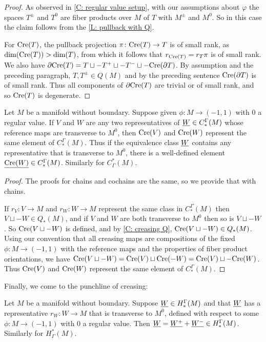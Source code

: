 \begin{proof}
	As observed in \cref{C: regular value setup}, with our assumptions about $\varphi$ the spaces $T^\pm$ and $T^0$ are fiber products over $M$ of $T$ with $M^\pm$ and $M^0$.
	So in this case the claim follows from the \cref{L: pullback with Q}.

	For $\mathrm{Cre}(T)$, the pullback projection $\pi \colon \mathrm{Cre}(T) \to T$ is of small rank, as $\dim(\mathrm{Cre}(T))>\dim(T)$, from which it follows that $r_{\mathrm{Cre}(T)} = r_T\pi$ is of small rank.
	We also have $\partial \mathrm{Cre}(T) = T \sqcup - T^+ \sqcup -T^- \sqcup -\mathrm{Cre}(\partial T)$.
	By assumption and the preceding paragraph, $T, T^\pm \in Q(M)$ and by the preceding sentence $\mathrm{Cre}(\partial T)$ is of small rank.
	Thus all components of $\partial \mathrm{Cre}(T)$ are trivial or of small rank, and so $\mathrm{Cre}(T)$ is degenerate.
\end{proof}

\begin{proposition}
	Let $M$ be a manifold without boundary.
	Suppose given $\phi \colon M \to (-1,1)$ with $0$ a regular value.
	If $V$ and $W$ are any two representatives of $\underline{W} \in C_*^\Gamma(M)$ whose reference maps are transverse to $M^0$, then $\mathrm{Cre}(V)$ and $\mathrm{Cre}(W)$ represent the same element of $C_*^\Gamma(M)$.
	Thus if the equivalence class $\underline{W}$ contains any representative that is transverse to $M^0$, there is a well-defined element $\underline{\mathrm{Cre}(W)} \in C_*^\Gamma(M)$.
	Similarly for $C^*_\Gamma(M)$.
\end{proposition}

\begin{proof}
	The proofs for chains and cochains are the same, so we provide that with chains.

	If $r_V \colon V \to M$ and $r_W \colon W \to M$ represent the same class in $C_*^\Gamma(M)$ then $V \sqcup -W \in Q_*(M)$, and if $V$ and $W$ are both transverse to $M^0$ then so is $V \sqcup -W$.
	So $\mathrm{Cre}(V\sqcup-W)$ is defined, and by \cref{C: creasing Q}, $\mathrm{Cre}(V \sqcup -W) \in Q_*(M)$.
	Using our convention that all creasing maps are compositions of the fixed $\phi \colon M \to (-1,1)$ with the reference maps and the properties of fiber product orientations, we have $\mathrm{Cre}(V \sqcup -W) = \mathrm{Cre}(V) \sqcup \mathrm{Cre}(-W) = \mathrm{Cre}(V) \sqcup -\mathrm{Cre}(W)$.
	Thus $\mathrm{Cre}(V)$ and $\mathrm{Cre}(W)$ represent the same element of $C_*^\Gamma(M)$.
\end{proof}

Finally, we come to the punchline of creasing:

\begin{theorem}\label{T: cohomology creasing}
	Let $M$ be a manifold without boundary.
	Suppose $\underline{W} \in H_*^\Gamma(M)$ and that $\underline{W}$ has a representative $r_W \colon W \to M$ that is transverse to $M^0$, defined with respect to some $\phi \colon M \to (-1,1)$ with $0$ a regular value.
	Then $\underline{W} = \underline{W^+} + \underline{W^-} \in H_*^\Gamma(M)$.
	Similarly for $H^*_\Gamma(M)$.
\end{theorem}

